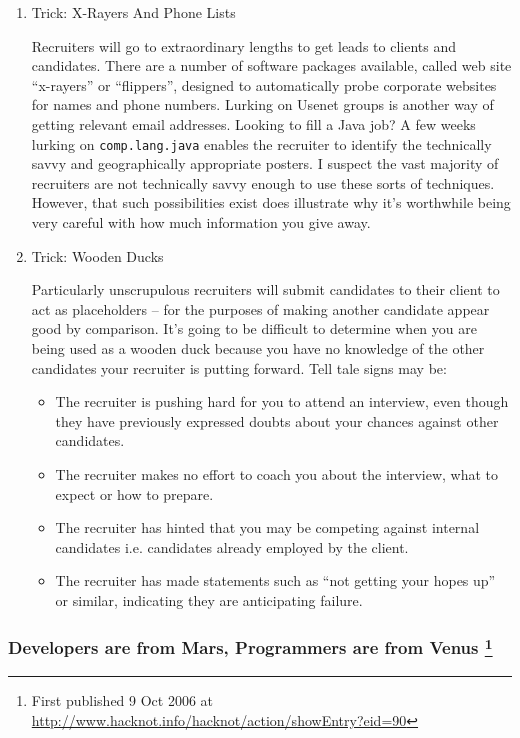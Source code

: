 \documentclass{article}
\begin{document}
\begin{enumerate}
\begin{enumerate}
\item Trick: X-Rayers And Phone Lists
\label{sec:orgheadline121}

Recruiters will go to extraordinary lengths to get leads to clients and
candidates. There are a number of software packages available, called
web site “x-rayers” or “flippers”, designed to automatically probe
corporate websites for names and phone numbers. Lurking on Usenet groups
is another way of getting relevant email addresses. Looking to fill a
Java job? A few weeks lurking on \texttt{comp.lang.java} enables the recruiter
to identify the technically savvy and geographically appropriate
posters. I suspect the vast majority of recruiters are not technically
savvy enough to use these sorts of techniques. However, that such
possibilities exist does illustrate why it's worthwhile being very
careful with how much information you give away.

\item Trick: Wooden Ducks
\label{sec:orgheadline122}

Particularly unscrupulous recruiters will submit candidates to their
client to act as placeholders -- for the purposes of making another
candidate appear good by comparison. It's going to be difficult to
determine when you are being used as a wooden duck because you have no
knowledge of the other candidates your recruiter is putting forward.
Tell tale signs may be:

\begin{itemize}
\item The recruiter is pushing hard for you to attend an interview, even
though they have previously expressed doubts about your chances
against other candidates.
\item The recruiter makes no effort to coach you about the interview, what
to expect or how to prepare.
\item The recruiter has hinted that you may be competing against internal
candidates i.e. candidates already employed by the client.\\
\item The recruiter has made statements such as “not getting your hopes up”
or similar, indicating they are anticipating failure.
\end{itemize}
\end{enumerate}
\end{enumerate}

\subsubsection{Developers are from Mars, Programmers are from Venus  \footnote{First published 9 Oct 2006 at
\url{http://www.hacknot.info/hacknot/action/showEntry?eid=90}}}
\label{sec:orgheadline134}
\end{document}
